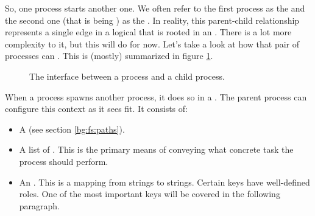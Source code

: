 So, one process starts another one. We often refer to the first process as the  and the second one (that is being ) as the . In reality, this parent-child relationship represents a single edge in a logical  that is rooted in an . There is a lot more complexity to it, but this will do for now. Let's take a look at how that pair of processes can . This is (mostly) summarized in figure \ref{fig:bg:processes:communication}.

\begin{figure}[tbp]
  
  \caption{The interface between a process and a child process.}
  \label{fig:bg:processes:communication}
\end{figure}

When a process spawns another process, it does so in a . The parent process can configure this context as it sees fit. It consists of:
\begin{itemize}
  \item A  (see section \ref{bg:fs:paths}).
  \item A list of . This is the primary means of conveying what concrete task the  process should perform.
  \item An . This is a mapping from strings to strings. Certain keys have well-defined roles. One of the most important keys will be covered in the following paragraph.
\end{itemize}

